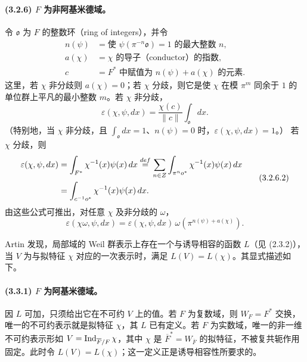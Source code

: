 \paragraph*{(3.2.6) $F$ 为非阿基米德域。}
令 $\mathfrak o$ 为 $F$ 的整数环（ring of integers），并令
\[
\begin{aligned}
 n(\psi)&=\text{使 }\psi(\pi^{-n}\mathfrak o)=1\text{ 的最大整数 }n,\\
 a(\chi)&=\chi\text{ 的导子（conductor）的指数},\\
 c&=F^*\text{ 中赋值为 }n(\psi)+a(\chi)\text{ 的元素}.
\end{aligned}
\]
这里，若 $\chi$ 非分歧则 $a(\chi)=0$；若 $\chi$ 分歧，则它是使 $\chi$ 在模 $\pi^m$ 同余于 $1$ 的单位群上平凡的最小整数 $m$。若 $\chi$ 非分歧，
\begin{equation}
 \varepsilon(\chi,\psi,dx)=\frac{\chi(c)}{\lVert c\rVert}\int_{\mathfrak o}dx.\tag{3.2.6.1}
\end{equation}
（特别地，当 $\chi$ 非分歧，且 $\int_{\mathfrak o}dx=1$、$n(\psi)=0$ 时，$\varepsilon(\chi,\psi,dx)=1$。）
若 $\chi$ 分歧，则
\begin{equation}
\begin{aligned}
 \varepsilon(\chi,\psi,dx)
 &=\int_{F^*}\chi^{-1}(x)\psi(x)\,dx
 \overset{def}=\sum_{n\in Z}\int_{\pi^no^*}\chi^{-1}(x)\psi(x)\,dx\\
 &=\int_{c^{-1}o^*}\chi^{-1}(x)\psi(x)\,dx.
\end{aligned}\tag{3.2.6.2}
\end{equation}
由这些公式可推出，对任意 $\chi$ 及非分歧的 $\omega$，
\begin{equation}
 \varepsilon(\chi\omega,\psi,dx)=\varepsilon(\chi,\psi,dx)\,
 \omega(\pi^{n(\psi)+a(\chi)}).\tag{3.2.6.3}
\end{equation}

Artin 发现，局部域的 Weil 群表示上存在一个与诱导相容的函数 $L$（见 (2.3.2)），当 $V$ 为与拟特征 $\chi$ 对应的一次表示时，满足 $L(V)=L(\chi)$。其显式描述如下。

\paragraph*{(3.3.1) $F$ 为阿基米德域。}
因 $L$ 可加，只须给出它在不可约 $V$ 上的值。若 $F$ 为复数域，则 $W_F=F^*$ 交换，唯一的不可约表示就是拟特征 $\chi$，其 $L$ 已有定义。若 $F$ 为实数域，唯一的非一维不可约表示形如 $V=\operatorname{Ind}_{\overline F/F}\chi$，其中 $\chi$ 是 $\overline F^*=W_{\overline F}$ 的拟特征，不被复共轭作用固定。此时令 $L(V)=L(\chi)$；这一定义正是诱导相容性所要求的。

